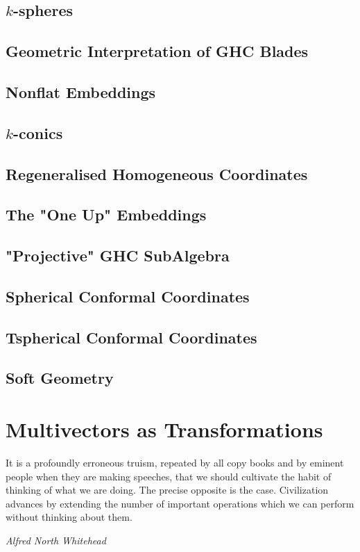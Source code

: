 \documentclass[a4paper]{book}
\numberwithin{equation}{chapter}
\begin{document}
    \section{$k$-spheres}
    \section{Geometric Interpretation of GHC Blades}
    \section{Nonflat Embeddings}
    \section{$k$-conics}
    \section{Regeneralised Homogeneous Coordinates}
    \section{ The "One Up" Embeddings}
    \section{"Projective" GHC SubAlgebra}
    \section{Spherical Conformal Coordinates}
    \section{Tspherical Conformal Coordinates}
    \section{Soft Geometry}



    
    \chapter{Multivectors as Transformations}

\epigraph{It is a profoundly erroneous truism, repeated by all copy books and by eminent people when they are making speeches, that we should cultivate the habit of thinking of what we are doing. The precise opposite is the case. Civilization advances by extending the number of important operations which we can perform without thinking about them.}{\textit{ Alfred North Whitehead }}
\end{document}
